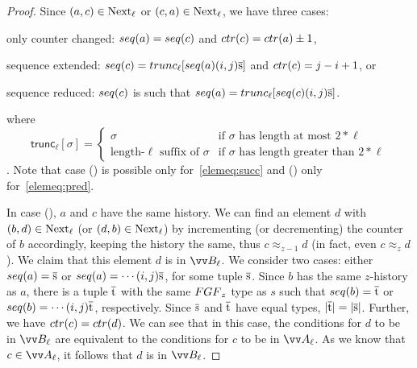 \begin{proof}
  Since $(a,c) \in \mathrm{Next}_{\ell}$ or $(c,a) \in \mathrm{Next}_{\ell}$, we have three cases:
  \begin{romanenumerate}
    \item only counter changed: $\seq{a} = \seq{c}$ and $\ctr{c} = \ctr{a} \pm 1$,
    \item sequence extended: $\seq{c} = \mathsf{trunc}_{\ell}[\seq{a} (i,j) \elemtuples]$ and $\ctr{c} = j-i+1$, or
    \item sequence reduced: $\seq{c}$ is such that $\seq{a} = \mathsf{trunc}_{\ell}[\seq{c} (i,j) \elemtuples]$.
  \end{romanenumerate}
  where
  \begin{displaymath}
    \mathsf{trunc}_{\ell}[\sigma] =
    \begin{cases}
      \sigma & \text{if $\sigma$ has length at most $2 * \ell$} \\
      \text{length-$\ell$ suffix of $\sigma$} & \text{if $\sigma$ has length greater than $2 * \ell$}
    \end{cases}
  \end{displaymath}.
  Note that case () is possible only for~\ref{elemeq:succ} and () only for~\ref{elemeq:pred}.

  In case (), $a$ and $c$ have the same history.
  We can find an element $d$ with $(b,d) \in \mathrm{Next}_{\ell}$ (or $(d,b) \in \mathrm{Next}_{\ell}$) by incrementing (or decrementing) the counter of $b$ accordingly, keeping the history the same, thus $c \approx_{z-1} d$ (in fact, even $c \approx_{z} d$).
  We claim that this element $d$ is in $\unraveldom{B}_{\ell}$.
  We consider two cases: either $\seq{a} = \elemtuples$ or $\seq{a} = \cdots (i,j) \elemtuples$, for some tuple $\overline{\mathrm{s}}$.
  Since $b$ has the same $z$-history as $a$, there is a tuple $\overline{\mathrm{t}}$ with the same $\FGF_{z}$ type as $s$ such that $\seq{b} = \elemtuplet$ or $\seq{b} = \cdots (i,j) \elemtuplet$, respectively.
  Since $\overline{\mathrm{s}}$ and $\overline{\mathrm{t}}$ have equal types, $|\overline{\mathrm{t}}| = |\overline{\mathrm{s}}|$.
  Further, we have $\ctr{c} = \ctr{d}$.
  We can see that in this case, the conditions for $d$ to be in $\unraveldom{B}_{\ell}$ are equivalent to the conditions for $c$ to be in $\unraveldom{A}_{\ell}$.
  As we know that $c \in \unraveldom{A}_{\ell}$, it follows that $d$ is in $\unraveldom{B}_{\ell}$.


\end{proof}
